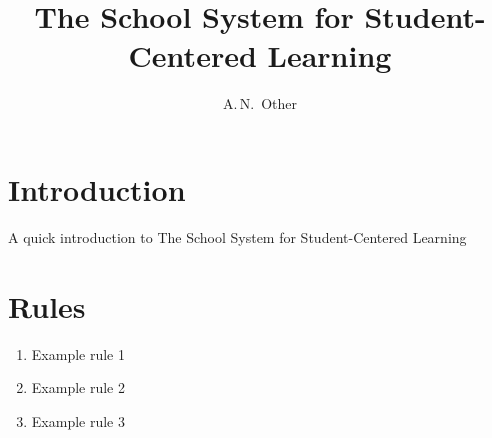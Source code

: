 \documentclass[titlepage]{article}
\author{A.\,N.~Other}
\title{The School System for Student-Centered Learning}
\begin{document}
\maketitle
\newpage
\tableofcontents
\newpage
\section{Introduction}
A quick introduction to The School System for Student-Centered Learning

\newpage
\section{Rules}
\begin{enumerate}
	\item Example rule 1
	\item Example rule 2
	\item Example rule 3
\end{enumerate}
\end{document}
